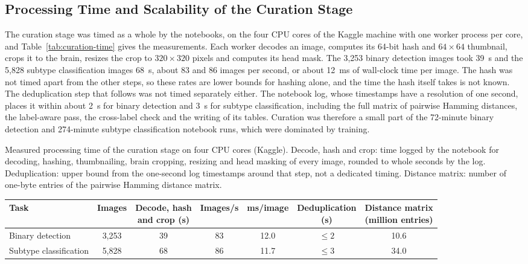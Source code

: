 \documentclass[a4paper,fleqn]{cas-sc}
\begin{document}
\subsection{Processing Time and Scalability of the Curation Stage}
\label{sec:curation-time}

The curation stage was timed as a whole by the notebooks, on the four CPU cores of the Kaggle machine with one worker process per core, and Table~\ref{tab:curation-time} gives the measurements. Each worker decodes an image, computes its 64-bit hash and $64\times 64$ thumbnail, crops it to the brain, resizes the crop to $320\times 320$ pixels and computes its head mask. The 3,253 binary detection images took 39~s and the 5,828 subtype classification images 68~s, about 83 and 86 images per second, or about 12~ms of wall-clock time per image. The hash was not timed apart from the other steps, so these rates are lower bounds for hashing alone, and the time the hash itself takes is not known. The deduplication step that follows was not timed separately either. The notebook log, whose timestamps have a resolution of one second, places it within about 2~s for binary detection and 3~s for subtype classification, including the full matrix of pairwise Hamming distances, the label-aware pass, the cross-label check and the writing of its tables. Curation was therefore a small part of the 72-minute binary detection and 274-minute subtype classification notebook runs, which were dominated by training.

\begin{heretable}
\centering
\caption{Measured processing time of the curation stage on four CPU cores (Kaggle). Decode, hash and crop: time logged by the notebook for decoding, hashing, thumbnailing, brain cropping, resizing and head masking of every image, rounded to whole seconds by the log. Deduplication: upper bound from the one-second log timestamps around that step, not a dedicated timing. Distance matrix: number of one-byte entries of the pairwise Hamming distance matrix.}
\label{tab:curation-time}
\small
\begin{tabular*}{\textwidth}{@{\extracolsep{\fill}}lcccccc@{}}
\toprule
Task & Images & \makecell{Decode, hash\\and crop (s)} & Images/s & ms/image & \makecell{Deduplication\\(s)} & \makecell{Distance matrix\\(million entries)} \\
\midrule
Binary detection & 3,253 & 39 & 83 & 12.0 & $\leq 2$ & 10.6 \\
Subtype classification & 5,828 & 68 & 86 & 11.7 & $\leq 3$ & 34.0 \\
\bottomrule
\end{tabular*}
\end{heretable}
\end{document}
